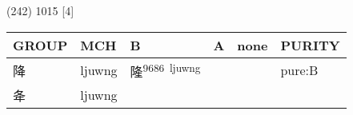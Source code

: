 \documentclass[14pt,a4paper]{scrartcl}
\begin{document}
(242) 1015 {[}4{]}

\begin{longtable}[c]{@{}llllll@{}}
\toprule
\begin{minipage}[b]{0.14\columnwidth}\raggedright\strut
GROUP
\strut\end{minipage} &
\begin{minipage}[b]{0.14\columnwidth}\raggedright\strut
MCH
\strut\end{minipage} &
\begin{minipage}[b]{0.14\columnwidth}\raggedright\strut
B
\strut\end{minipage} &
\begin{minipage}[b]{0.14\columnwidth}\raggedright\strut
A
\strut\end{minipage} &
\begin{minipage}[b]{0.14\columnwidth}\raggedright\strut
none
\strut\end{minipage} &
\begin{minipage}[b]{0.14\columnwidth}\raggedright\strut
PURITY
\strut\end{minipage}\tabularnewline
\midrule
\endhead
\begin{minipage}[t]{0.14\columnwidth}\raggedright\strut
降
\strut\end{minipage} &
\begin{minipage}[t]{0.14\columnwidth}\raggedright\strut
ljuwng
\strut\end{minipage} &
\begin{minipage}[t]{0.14\columnwidth}\raggedright\strut
隆\textsuperscript{9686~ljuwng}
\strut\end{minipage} &
\begin{minipage}[t]{0.14\columnwidth}\raggedright\strut
\strut\end{minipage} &
\begin{minipage}[t]{0.14\columnwidth}\raggedright\strut
\strut\end{minipage} &
\begin{minipage}[t]{0.14\columnwidth}\raggedright\strut
pure:B
\strut\end{minipage}\tabularnewline
\begin{minipage}[t]{0.14\columnwidth}\raggedright\strut
夅
\strut\end{minipage} &
\begin{minipage}[t]{0.14\columnwidth}\raggedright\strut
ljuwng
\strut\end{minipage} &
\begin{minipage}[t]{0.14\columnwidth}\raggedright\strut
\strut\end{minipage} &

\end{longtable}
\end{document}
